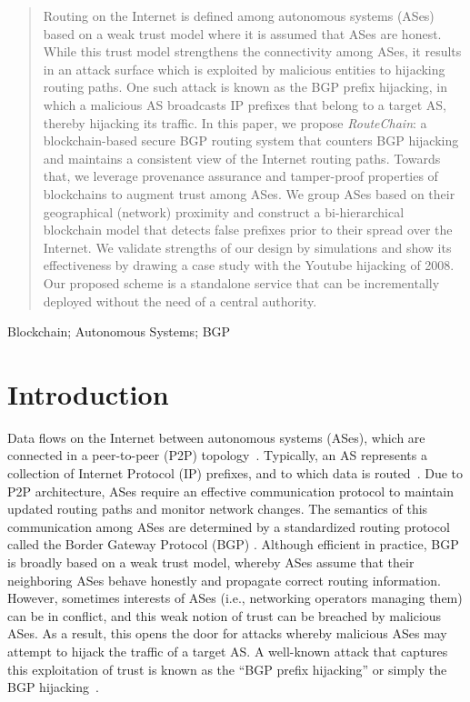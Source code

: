 \documentclass[conference]{IEEEtran}
\newcommand{\rc}{{{\em RouteChain}}\xspace}
\begin{document}
\begin{abstract}
Routing on the Internet is defined among autonomous systems (ASes) based on a weak trust model where it is assumed that ASes are honest. While this trust model strengthens the connectivity among ASes, it results in an attack surface which is exploited by malicious entities to hijacking routing paths. One such attack is known as the BGP prefix hijacking, in which a malicious AS broadcasts IP prefixes that belong to a target AS, thereby hijacking its traffic. In this paper, we propose \rc: a blockchain-based secure BGP routing system that counters BGP hijacking and maintains a consistent view of the Internet routing paths. Towards that, we leverage provenance assurance and tamper-proof properties of blockchains to augment trust among ASes. We group ASes based on their geographical (network) proximity and construct a bi-hierarchical blockchain model that detects false prefixes prior to their spread over the Internet. We validate strengths of our design by simulations and show its effectiveness by drawing a case study with the Youtube hijacking of 2008. Our proposed scheme is a standalone service that can be incrementally deployed without the need of a central authority.  
\end{abstract}

\begin{IEEEkeywords} Blockchain; Autonomous Systems; BGP \end{IEEEkeywords}


\section{Introduction}\label{sec:introduction}
Data flows on the Internet between autonomous systems (ASes), which are connected in a peer-to-peer (P2P) topology~\cite{SpotoGM14,KanzakiF13}. Typically, an AS represents a collection of Internet Protocol (IP) prefixes, and to which data is routed~\cite{PadmanabhanL2001}. Due to P2P architecture, ASes require an effective communication protocol to maintain updated routing paths and monitor network changes. The semantics of this communication among ASes are determined by a standardized routing protocol called the Border Gateway Protocol (BGP) \cite{SermpezisKDD18}. Although efficient in practice, BGP is broadly based on a weak trust model, whereby ASes assume that their neighboring ASes behave honestly and propagate correct routing information. However, sometimes interests of ASes (i.e., networking operators managing them) can be in conflict, and this weak notion of trust can be breached by malicious ASes. As a result, this opens the door for attacks whereby malicious ASes may attempt to hijack the traffic of a target AS. A well-known attack that captures this exploitation of trust is known as the ``BGP prefix hijacking'' or simply the BGP hijacking~\cite{MitsevaPE18,JonkerPDS18}. 
\end{document}
